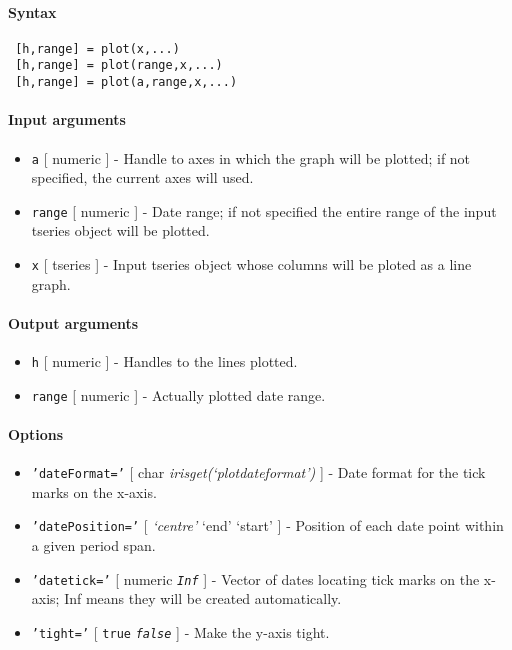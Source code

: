 


	\paragraph{Syntax}
 
 \begin{verbatim}
 [h,range] = plot(x,...)
 [h,range] = plot(range,x,...)
 [h,range] = plot(a,range,x,...)
 \end{verbatim}
 
 \paragraph{Input arguments}
 
 \begin{itemize}
 \item
   \texttt{a} {[} numeric {]} - Handle to axes in which the graph will be
   plotted; if not specified, the current axes will used.
 \item
   \texttt{range} {[} numeric {]} - Date range; if not specified the
   entire range of the input tseries object will be plotted.
 \item
   \texttt{x} {[} tseries {]} - Input tseries object whose columns will
   be ploted as a line graph.
 \end{itemize}
 
 \paragraph{Output arguments}
 
 \begin{itemize}
 \item
   \texttt{h} {[} numeric {]} - Handles to the lines plotted.
 \item
   \texttt{range} {[} numeric {]} - Actually plotted date range.
 \end{itemize}
 
 \paragraph{Options}
 
 \begin{itemize}
 \item
   \texttt{'dateFormat='} {[} char \textbar{}
   \emph{irisget(`plotdateformat')} {]} - Date format for the tick marks
   on the x-axis.
 \item
   \texttt{'datePosition='} {[} \emph{`centre'} \textbar{} `end'
   \textbar{} `start' {]} - Position of each date point within a given
   period span.
 \item
   \texttt{'datetick='} {[} numeric \textbar{} \emph{\texttt{Inf}} {]} -
   Vector of dates locating tick marks on the x-axis; Inf means they will
   be created automatically.
 \item
   \texttt{'tight='} {[} \texttt{true} \textbar{} \emph{\texttt{false}}
   {]} - Make the y-axis tight.
 \end{itemize}
 
